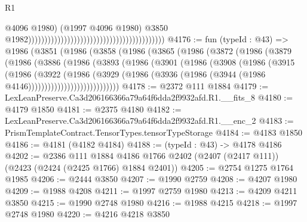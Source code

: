 \begin{lexlean}{R1}
\begin{coremodule}
                                                                                          @4096
                                                                                          @1980)
                                                                                        (@1997
                                                                                          @4096
                                                                                          @1980)
                                                                                        @3850
                                                                                        @1982))))))))))))))))))))))))))))))))))))))))))
@4176 := fun (typeId : @43) =>
  @1986
    (@3851
      (@1986
        (@3858
          (@1986
            (@3865
              (@1986
                (@3872
                  (@1986
                    (@3879
                      (@1986
                        (@3886
                          (@1986
                            (@3893
                              (@1986
                                (@3901
                                  (@1986
                                    (@3908
                                      (@1986
                                        (@3915
                                          (@1986
                                            (@3922
                                              (@1986
                                                (@3929
                                                  (@1986
                                                    (@3936
                                                      (@1986
                                                        (@3944
                                                          (@1986 @4146))))))))))))))))))))))))))))
@4178 := @2372 @111 @1884
@4179 := LexLeanPreserve.Ca3d206166366a79a64f6dda2f9932afd.R1.__fits_8
@4180 := @4179 @1850
@4181 := @2375 @4180
@4182 := LexLeanPreserve.Ca3d206166366a79a64f6dda2f9932afd.R1.__enc_2
@4183 := PrismTemplateContract.TensorTypes.tensorTypeStorage
@4184 := @4183 @1850
@4186 := @4181 (@4182 @4184)
@4188 := (typeId : @43) -> @4178 @4186
@4202 := @2386
    @111
    @1884
    @4186
    @1766
    @2402
    (@2407 (@2417 @111))
    (@2423 (@2424 (@2425 @1766) @1884 @2401))
@4205 := @2754 @1275 @1764 @1985
@4206 := @2444 @3850
@4207 := @1990 @2759
@4208 := @4207 @1980
@4209 := @1988 @4208
@4211 := @1997 @2759 @1980
@4213 := @4209 @4211 @3850
@4215 := @1990 @2748 @1980
@4216 := @1988 @4215
@4218 := @1997 @2748 @1980
@4220 := @4216 @4218 @3850

\end{coremodule}
\end{lexlean}
